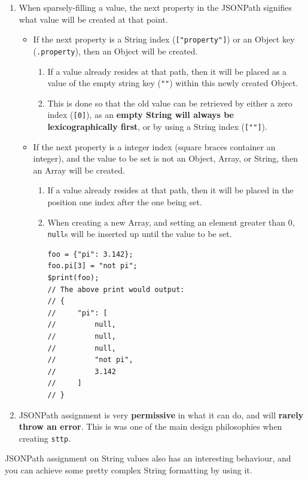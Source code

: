 \documentclass[]{full}
\theoremstyle{definition}
\begin{document}
\begin{enumerate}
    \item When sparsely-filling a value, the next property in the JSONPath signifies what value will be created at that point.
    \begin{itemize}
        \item If the next property is a String index (\verb|["property"]|) or an Object key (\verb|.property|), then an Object will be created.
        \begin{enumerate}
            \item If a value already resides at that path, then it will be placed as a value of the empty string key (\verb|""|) within this newly created Object.
            \item This is done so that the old value can be retrieved by either a zero index (\verb|[0]|), as an \textbf{empty String will always be lexicographically first}, or by using a String index (\verb|[""]|).
        \end{enumerate}
        \item If the next property is a integer index (square braces container an integer), and the value to be set is not an Object, Array, or String, then an Array will be created.
        \begin{enumerate}
            \item If a value already resides at that path, then it will be placed in the position one index after the one being set.
            \item When creating a new Array, and setting an element greater than 0, \verb|null|s will be inserted up until the value to be set.
            \begin{verbatim}
foo = {"pi": 3.142};
foo.pi[3] = "not pi";
$print(foo);
// The above print would output:
// {
//     "pi": [
//         null,
//         null,
//         null,
//         "not pi",
//         3.142
//     ]
// }
            \end{verbatim}
        \end{enumerate}
    \end{itemize}
    \item JSONPath assignment is very \textbf{permissive} in what it can do, and will \textbf{rarely throw an error}. This is was one of the main design philosophies when creating \verb|sttp|.
\end{enumerate}

JSONPath assignment on String values also has an interesting behaviour, and you can achieve some pretty complex String formatting by using it.
\end{document}
